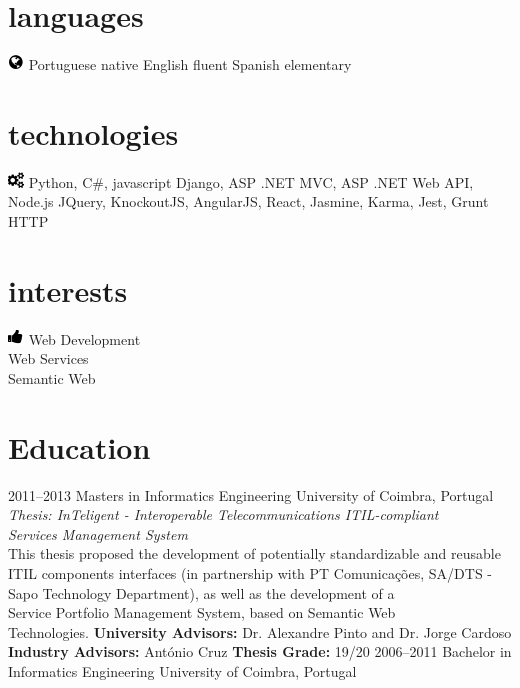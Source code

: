 \documentclass[]{friggeri-cv} %
\begin{document}
\begin{aside}
\section{languages}
\includegraphics[scale=0.5, left]{globe.png}
\vspace{-5mm} Portuguese native
English fluent
Spanish elementary
\section{technologies}
\includegraphics[scale=0.5, left]{cogs.png}
\vspace{-5mm}  Python, C\#, javascript
Django, ASP .NET MVC, ASP .NET Web API, Node.js
JQuery, KnockoutJS, AngularJS, React, Jasmine, Karma, Jest, Grunt
HTTP
\section{interests}
\includegraphics[scale=0.5, left]{like.png}
\vspace{-5mm} Web Development\\ Web Services\\ Semantic Web
\end{aside}





\section{Education}

\begin{entrylist}
\entrymasters
{2011--2013}
{Masters {\normalfont in Informatics Engineering}}
{University of Coimbra, Portugal}
{\emph{Thesis: InTeligent - Interoperable Telecommunications ITIL-compliant \\ Services Management System} \\ This thesis proposed the development of potentially standardizable and reusable ITIL components interfaces (in partnership with PT Comunicações, SA/DTS - Sapo Technology Department), as well as the development of a \\Service Portfolio Management System, based on Semantic Web \\Technologies.}
{\textbf{University Advisors:} Dr. Alexandre Pinto and Dr. Jorge Cardoso}
{\textbf{Industry Advisors:} António Cruz}
{\textbf{Thesis Grade:} 19/20}
\entrybachelor
{2006--2011}
{Bachelor {\normalfont in Informatics Engineering}}
{University of Coimbra, Portugal}
\end{entrylist}
\end{document}
